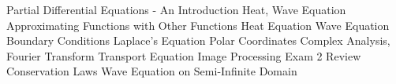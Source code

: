 \documentclass{article}
\begin{document}
\maketitle
%
\newpage
%
\tableofcontents
\newpage
{Partial Differential Equations - An Introduction}
{Heat, Wave Equation}
{Approximating Functions with Other Functions}
{Heat Equation}
{Wave Equation}
{Boundary Conditions}
{Laplace's Equation}
{Polar Coordinates}
{Complex Analysis, Fourier Transform}
{Transport Equation}
{Image Processing}
{Exam 2 Review}
{Conservation Laws}
{Wave Equation on Semi-Infinite Domain}
\newpage
\end{document}
